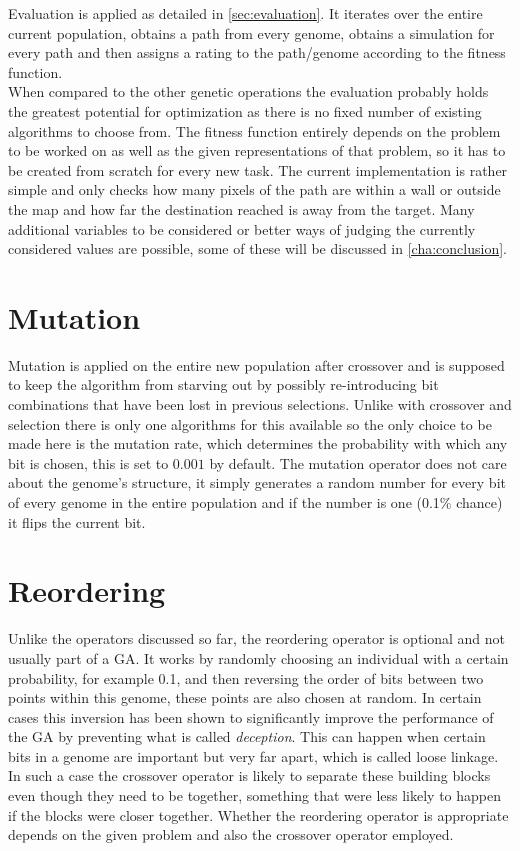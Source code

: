 Evaluation is applied as detailed in \ref{sec:evaluation}. It iterates over the entire current population, obtains a path from every genome, obtains a simulation for every path and then assigns a rating to the path/genome according to the fitness function. \\
When compared to the other genetic operations the evaluation probably holds the greatest potential for optimization as there is no fixed number of existing algorithms to choose from. The fitness function entirely depends on the problem to be worked on as well as the given representations of that problem, so it has to be created from scratch for every new task. The current implementation is rather simple and only checks how many pixels of the path are within a wall or outside the map and how far the destination reached is away from the target. Many additional variables to be considered or better ways of judging the currently considered values are possible, some of these will be discussed in \ref{cha:conclusion}.

\section{Mutation} %
\label{sec:imp_mutation}

Mutation is applied on the entire new population after crossover and is supposed to keep the algorithm from starving out by possibly re-introducing bit combinations that have been lost in previous selections. Unlike with crossover and selection there is only one algorithms for this available so the only choice to be made here is the mutation rate, which determines the probability with which any bit is chosen, this is set to $0.001$ by default. The mutation operator does not care about the genome's structure, it simply generates a random number for every bit of every genome in the entire population and if the number is one (0.1\% chance) it flips the current bit.

\section{Reordering}
\label{sec:reordering}

Unlike the operators discussed so far, the reordering operator is optional and not usually part of a GA. It works by randomly choosing an individual with a certain probability, for example 0.1, and then reversing the order of bits between two points within this genome, these points are also chosen at random. In certain cases this inversion has been shown to significantly improve the performance of the GA by preventing what is called \textit{deception}\cite{8}. This can happen when certain bits in a genome are important but very far apart, which is called loose linkage. In such a case the crossover operator is likely to separate these building blocks even though they need to be together, something that were less likely to happen if the blocks were closer together. Whether the reordering operator is appropriate depends on the given problem and also the crossover operator employed. \cite{8} %
